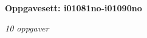 \centerline{\bf Oppgavesett: i01081no-i01090no}
\vskip 10pt
\centerline{\it 10 oppgaver}\vskip 10pt
\vskip 10pt
